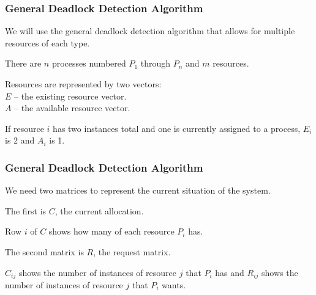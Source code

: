\begin{frame}
\frametitle{General Deadlock Detection Algorithm}

We will use the general deadlock detection algorithm that allows for multiple resources of each type. 

There are $n$ processes numbered $P_{1}$ through $P_{n}$ and $m$ resources. 

Resources are represented by two vectors:\\
\quad $E$ -- the existing resource vector.\\
\quad $A$ -- the available resource vector.

If resource $i$ has two instances total and one is currently assigned to a process, $E_{i}$ is 2 and $A_{i}$ is 1.

\end{frame}

\begin{frame}
\frametitle{General Deadlock Detection Algorithm}

We need two matrices to represent the current situation of the system. 

The first is $C$, the current allocation.

Row $i$ of $C$ shows how many of each resource $P_{i}$ has. 

The second matrix is $R$, the request matrix. 

$C_{ij}$ shows the number of instances of resource $j$ that $P_{i}$ has and $R_{ij}$ shows the number of instances of resource $j$ that $P_{i}$ wants.

\end{frame}

